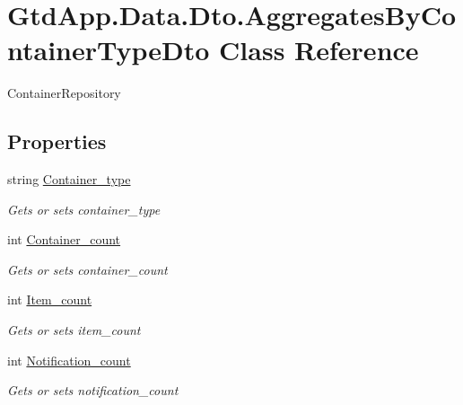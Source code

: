 \hypertarget{class_gtd_app_1_1_data_1_1_dto_1_1_aggregates_by_container_type_dto}{}\section{Gtd\+App.\+Data.\+Dto.\+Aggregates\+By\+Container\+Type\+Dto Class Reference}
\label{class_gtd_app_1_1_data_1_1_dto_1_1_aggregates_by_container_type_dto}


Container\+Repository  


\subsection*{Properties}
\begin{DoxyCompactItemize}
\item 
string \mbox{\hyperlink{class_gtd_app_1_1_data_1_1_dto_1_1_aggregates_by_container_type_dto_a839558cdd8ea1e4f74fb4e41b1fa5ae0}{Container\+\_\+type}}
\begin{DoxyCompactList}\small\item\em Gets or sets container\+\_\+type \end{DoxyCompactList}\item 
int \mbox{\hyperlink{class_gtd_app_1_1_data_1_1_dto_1_1_aggregates_by_container_type_dto_aab415afa60e58d975ad3b80d5d77eed5}{Container\+\_\+count}}
\begin{DoxyCompactList}\small\item\em Gets or sets container\+\_\+count \end{DoxyCompactList}\item 
int \mbox{\hyperlink{class_gtd_app_1_1_data_1_1_dto_1_1_aggregates_by_container_type_dto_a70501f6aaa4c686f2165af22f86fbbf4}{Item\+\_\+count}}
\begin{DoxyCompactList}\small\item\em Gets or sets item\+\_\+count \end{DoxyCompactList}\item 
int \mbox{\hyperlink{class_gtd_app_1_1_data_1_1_dto_1_1_aggregates_by_container_type_dto_a6e3f6d54c17b753df1d669f8fdb51b77}{Notification\+\_\+count}}
\begin{DoxyCompactList}\small\item\em Gets or sets notification\+\_\+count \end{DoxyCompactList}\end{DoxyCompactItemize}


